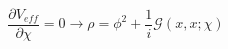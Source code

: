 \begin{equation}
\frac{\partial V_{eff}}{\partial \chi} =0 \rightarrow \rho=\phi^2 + \frac{1}{i}
{\mathcal G}(x,x;\chi)
\end{equation}

